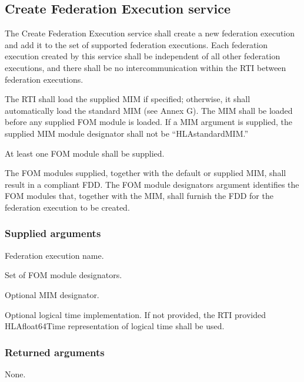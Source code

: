 \subsection{Create Federation Execution service}

The Create Federation Execution service shall create a new federation execution and add it to the set of supported federation executions. Each federation execution created by this service shall be independent of all other federation executions, and there shall be no intercommunication within the RTI between federation executions.

The RTI shall load the supplied MIM if specified; otherwise, it shall automatically load the standard MIM (see Annex G). The MIM shall be loaded before any supplied FOM module is loaded. If a MIM argument is supplied, the supplied MIM module designator shall not be ``HLAstandardMIM.''

At least one FOM module shall be supplied.

The FOM modules supplied, together with the default or supplied MIM, shall result in a compliant FDD. The FOM module designators argument identifies the FOM modules that, together with the MIM, shall furnish the FDD for the federation execution to be created.

\subsubsection{Supplied arguments}

\begin{stdalphalist}
    \item Federation execution name.
    \item Set of FOM module designators.
    \item Optional MIM designator.
    \item Optional logical time implementation. If not provided, the RTI provided HLAfloat64Time representation of logical time shall be used.
\end{stdalphalist}

\subsubsection{Returned arguments}

\begin{stdalphalist}
    \item None.
\end{stdalphalist}

